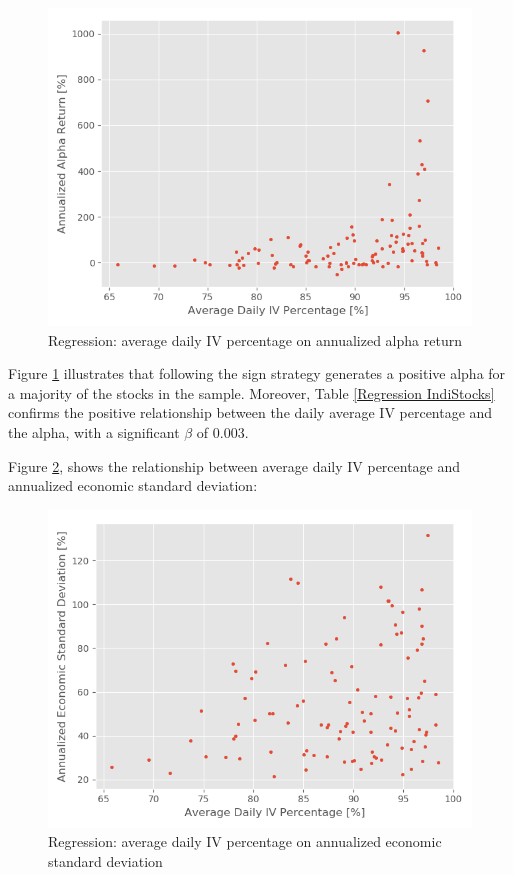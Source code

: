 \begin{figure}[h]
    \centering
    \includegraphics[scale = 0.5]{Plot/IndividualStockRegression2.png}
    \caption{Regression: average daily IV percentage on annualized alpha return}
    \label{IVAlphaRegression}
\end{figure}

\newpage

Figure \ref{IVAlphaRegression} illustrates that following the sign strategy generates a positive alpha for a majority of the stocks in the sample. Moreover, Table \ref{Regression IndiStocks} confirms the positive relationship between the daily average IV percentage and the alpha, with a significant $\beta$ of $0.003$. 

Figure \ref{IVtoVol}, shows the relationship between average daily IV percentage and annualized economic standard deviation:

\begin{figure}[h]
    \centering
    \includegraphics[scale = 0.5]{Plot/IVvsEconomicVolatilityRegression.png}
    \caption{Regression: average daily IV percentage on annualized economic standard deviation}
    \label{IVtoVol}
\end{figure}


